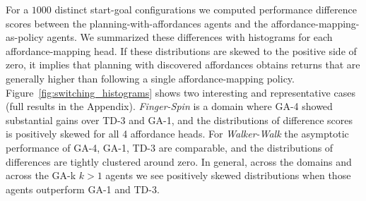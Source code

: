 \documentclass[nohyperref]{article}
\theoremstyle{plain}
\theoremstyle{definition}
\theoremstyle{remark}
\newcommand{\grasp}{{G}r{ASP} }
\begin{document}
For a $1000$ distinct start-goal configurations %
we 
computed performance difference scores between the planning-with-affordances agents and the affordance-mapping-as-policy agents. %
We summarized these differences with histograms for each affordance-mapping head. %
If these distributions are skewed to the positive side of zero, it implies that %
planning with discovered affordances obtains  returns that are generally higher than %
following a single affordance-mapping policy.
Figure~\ref{fig:switching_histograms} shows two interesting and representative cases %
(full results in the Appendix).  \emph{Finger-Spin} is a domain where GA-4 showed substantial gains over TD-3 and GA-1, and %
the distributions of difference scores is positively skewed for all 4 affordance heads. For \emph{Walker-Walk} the asymptotic performance of GA-4, GA-1, TD-3 are comparable, and the distributions of differences are tightly clustered around zero.
In general, across the domains and across the GA-k $k>1$ agents we see positively skewed distributions when those agents outperform GA-1 and TD-3.
\end{document}
